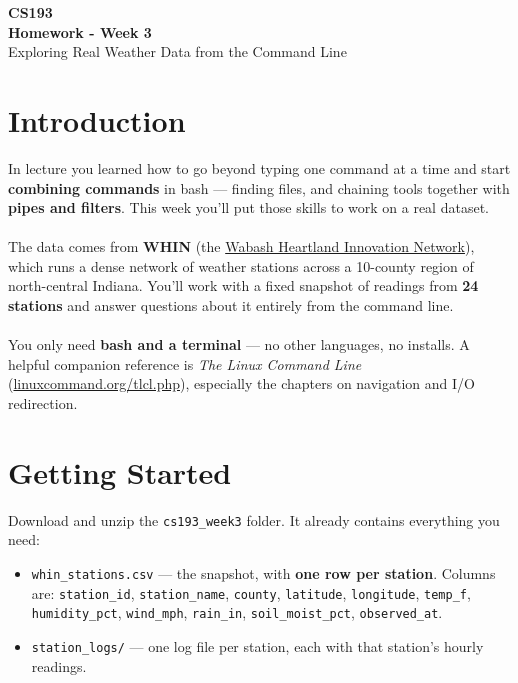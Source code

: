 \documentclass[11pt]{article}
\begin{document}
\begin{center}
    {\Huge \textbf{CS193}} \\
    \vspace{2mm}
    {\Large \textbf{Homework - Week 3}} \\
    \vspace{2mm}
    {\large Exploring Real Weather Data from the Command Line} \\
\end{center}

\section{Introduction}
In lecture you learned how to go beyond typing one command at a time and start \textbf{combining commands} in bash --- finding files, and chaining tools together with \textbf{pipes and filters}. This week you'll put those skills to work on a real dataset.
\\\\
The data comes from \textbf{WHIN} (the \href{https://www.whin.org/weather}{Wabash Heartland Innovation Network}), which runs a dense network of weather stations across a 10-county region of north-central Indiana. You'll work with a fixed snapshot of readings from \textbf{24 stations} and answer questions about it entirely from the command line.
\\\\
You only need \textbf{bash and a terminal} --- no other languages, no installs. A helpful companion reference is \textit{The Linux Command Line} (\href{https://linuxcommand.org/tlcl.php}{linuxcommand.org/tlcl.php}), especially the chapters on navigation and I/O redirection.

\section{Getting Started}
Download and unzip the \texttt{cs193\_week3} folder. It already contains everything you need:
\begin{itemize}
    \item \texttt{whin\_stations.csv} --- the snapshot, with \textbf{one row per station}. Columns are: \texttt{station\_id}, \texttt{station\_name}, \texttt{county}, \texttt{latitude}, \texttt{longitude}, \texttt{temp\_f}, \texttt{humidity\_pct}, \texttt{wind\_mph}, \texttt{rain\_in}, \texttt{soil\_moist\_pct}, \texttt{observed\_at}.
    \item \texttt{station\_logs/} --- one log file per station, each with that station's hourly readings.
\end{itemize}
\end{document}
